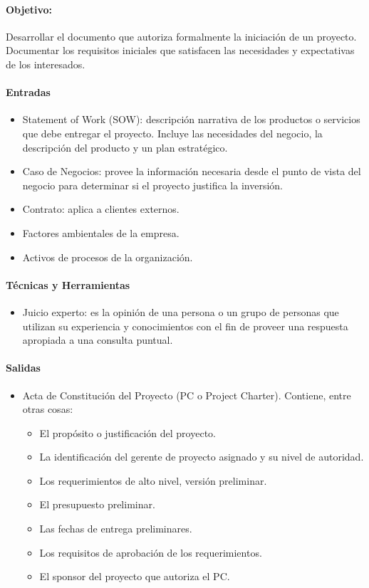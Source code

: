 \documentclass[a4paper,twosides]{article}
\newlength{\wideitemsep}
\let\olditem\item
\renewcommand{\item}{\setlength{\itemsep}{\wideitemsep}\olditem}
\begin{document}
\paragraph{Objetivo:} Desarrollar el documento que autoriza formalmente la iniciación de un proyecto. Documentar los requisitos iniciales que satisfacen las necesidades y expectativas de los interesados.
\paragraph{Entradas}
\begin{itemize}
\item Statement of Work (SOW): descripción narrativa de los productos o servicios que debe entregar el proyecto.
Incluye las necesidades del negocio, la descripción del producto y un plan estratégico.
\item Caso de Negocios: provee la información necesaria desde el punto de vista del negocio para determinar si el proyecto justifica la inversión.
\item Contrato: aplica a clientes externos.
\item Factores ambientales de la empresa.
\item Activos de procesos de la organización.
\end{itemize}
\paragraph{Técnicas y Herramientas}
\begin{itemize}
\item Juicio experto: es la opinión de una persona o un grupo de personas que utilizan su experiencia y conocimientos con el fin de proveer una respuesta apropiada a una consulta puntual.
\end{itemize}
\paragraph{Salidas}
\begin{itemize}
\item Acta de Constitución del Proyecto (PC o Project Charter).
Contiene, entre otras cosas:
\begin{itemize}
\item El propósito o justificación del proyecto.
\item La identificación del gerente de proyecto asignado y su nivel de autoridad.
\item Los requerimientos de alto nivel, versión preliminar.
\item El presupuesto preliminar.
\item Las fechas de entrega preliminares.
\item Los requisitos de aprobación de los requerimientos.
\item El sponsor del proyecto que autoriza el PC.
\end{itemize}
\end{itemize}
\end{document}
